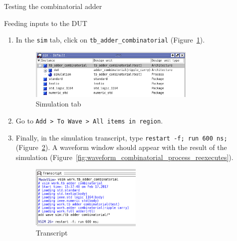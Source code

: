 \documentclass[lab]{course}
\begin{document}
\begin{section}{Testing the combinatorial adder}
\begin{subsection}{Feeding inputs to the DUT}
\begin{enumerate}
            \item In the \verb+sim+ tab, click on \verb+tb_adder_combinatorial+ (Figure~\ref{fig:sim_tab_tb_adder_combinatorial_simulation}).

            \begin{figure}[!h]
                \begin{centering}
                    \includegraphics[width=0.75\textwidth]{figs/sim_tab_tb_adder_combinatorial_simulation.png}
                    \caption{Simulation tab}
                    \label{fig:sim_tab_tb_adder_combinatorial_simulation}
                \end{centering}
            \end{figure}

            \item Go to \verb+Add > To Wave > All items in region+.

            \item Finally, in the simulation transcript, type \verb+restart -f; run 600 ns;+ (Figure~\ref{fig:waveform_combinatorial_transcript_basic_version}). A waveform window should appear with the result of the simulation (Figure~\ref{fig:waveform_combinatorial_process_reexecutes}).

            \begin{figure}[!h]
                \begin{centering}
                    \includegraphics[width=0.5\textwidth]{figs/waveform_combinatorial_transcript_basic_version.png}
                    \caption{Transcript}
                    \label{fig:waveform_combinatorial_transcript_basic_version}
                \end{centering}
            \end{figure}


\end{enumerate}
\end{subsection}
\end{section}
\end{document}

